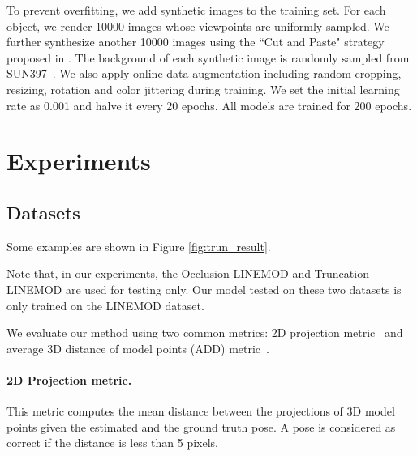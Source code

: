 \documentclass[10pt,twocolumn,letterpaper]{article}
\begin{document}
To prevent overfitting, we add synthetic images to the training set. For each object, we render 10000 images whose viewpoints are uniformly sampled. We further synthesize another 10000 images using the ``Cut and Paste" strategy proposed in \cite{dwibedi2017cut}. The background of each synthetic image is randomly sampled from SUN397~\cite{xiao2010sun}. We also apply online data augmentation including random cropping, resizing, rotation and color jittering during training. We set the initial learning rate as 0.001 and halve it every 20 epochs. All models are trained for 200 epochs.

\section{Experiments}\subsection{Datasets}%


Some examples are shown in Figure \ref{fig:trun_result}. 

Note that, in our experiments, the Occlusion LINEMOD and Truncation LINEMOD are used for testing only. Our model tested on these two datasets is only trained on the LINEMOD dataset.



We evaluate our method using two common metrics: 2D projection metric~\cite{brachmann2016uncertainty} and average 3D distance of model points (ADD) metric~\cite{hinterstoisser2012model}.

\paragraph{2D Projection metric.} This metric computes the mean distance between the projections of 3D model points given the estimated and the ground truth pose. A pose is considered as correct if the distance is less than 5 pixels.
\end{document}
